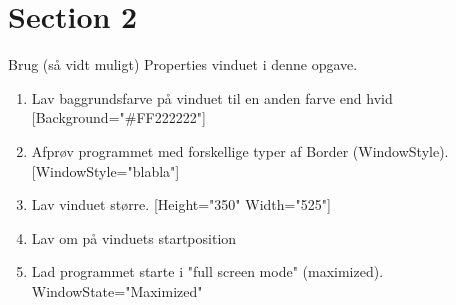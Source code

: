\chapter{Section 2}

Brug (så vidt muligt) Properties vinduet i denne opgave.

\begin{enumerate}
	\item Lav baggrundsfarve på vinduet til en anden farve end hvid
	[Background="\#FF222222"]
	\item Afprøv programmet med forskellige typer af Border (WindowStyle).
	[WindowStyle="blabla"]
	\item Lav vinduet større.
	[Height="350" Width="525"]
	\item Lav om på vinduets startposition
	\item Lad programmet starte i "full screen mode" (maximized).
	WindowState="Maximized"
\end{enumerate}
